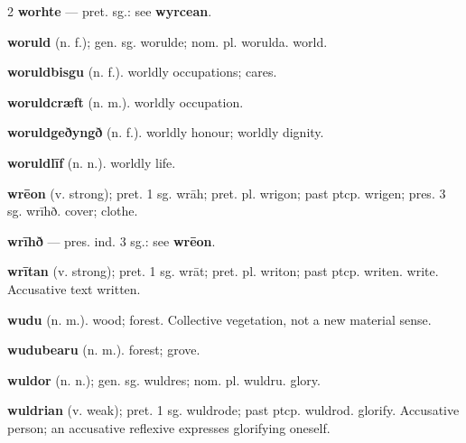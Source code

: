 \begin{multicols*}{2}
\textbf{worhte} — pret. sg.: see \textbf{wyrcean}.\par
\textbf{woruld} (n. f.); gen. sg. worulde; nom. pl. worulda. world.\par
\textbf{woruldbisgu} (n. f.). worldly occupations; cares.\par
\textbf{woruldcræft} (n. m.). worldly occupation.\par
\textbf{woruldgeðyngð} (n. f.). worldly honour; worldly dignity.\par
\textbf{woruldlīf} (n. n.). worldly life.\par
\textbf{wrēon} (v. strong); pret. 1 sg. wrāh; pret. pl. wrigon; past ptcp. wrigen; pres. 3 sg. wrīhð. cover; clothe.\par
\textbf{wrīhð} — pres. ind. 3 sg.: see \textbf{wrēon}.\par
\textbf{wrītan} (v. strong); pret. 1 sg. wrāt; pret. pl. writon; past ptcp. writen. write. Accusative text written.\par
\textbf{wudu} (n. m.). wood; forest. Collective vegetation, not a new material sense.\par
\textbf{wudubearu} (n. m.). forest; grove.\par
\textbf{wuldor} (n. n.); gen. sg. wuldres; nom. pl. wuldru. glory.\par
\textbf{wuldrian} (v. weak); pret. 1 sg. wuldrode; past ptcp. wuldrod. glorify. Accusative person; an accusative reflexive expresses glorifying oneself.\par

\end{multicols*}
